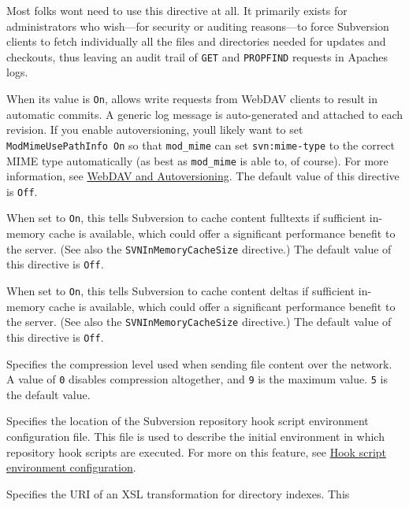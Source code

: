 \begin{description}
Most folks won\textquotesingle t need to use this directive at all. It
primarily exists for administrators who wish---for security or auditing
reasons---to force Subversion clients to fetch individually all the
files and directories needed for updates and checkouts, thus leaving an
audit trail of \texttt{GET} and \texttt{PROPFIND} requests in
Apache\textquotesingle s logs.
\item[\texttt{SVNAutoversioning\ On\textbar{}Off}]
When its value is \texttt{On}, allows write requests from WebDAV clients
to result in automatic commits. A generic log message is auto-generated
and attached to each revision. If you enable autoversioning,
you\textquotesingle ll likely want to set
\texttt{ModMimeUsePathInfo\ On} so that \texttt{mod\_mime} can set
\texttt{svn:mime-type} to the correct MIME type automatically (as best
as \texttt{mod\_mime} is able to, of course). For more information, see
\hyperref[svn.webdav]{WebDAV and Autoversioning}. The default value of
this directive is \texttt{Off}.
\item[\texttt{SVNCacheFullTexts\ On\textbar{}Off}]
When set to \texttt{On}, this tells Subversion to cache content
fulltexts if sufficient in-memory cache is available, which could offer
a significant performance benefit to the server. (See also the
\texttt{SVNInMemoryCacheSize} directive.) The default value of this
directive is \texttt{Off}.
\item[\texttt{SVNCacheTextDeltas\ On\textbar{}Off}]
When set to \texttt{On}, this tells Subversion to cache content deltas
if sufficient in-memory cache is available, which could offer a
significant performance benefit to the server. (See also the
\texttt{SVNInMemoryCacheSize} directive.) The default value of this
directive is \texttt{Off}.
\item[\texttt{SVNCompressionLevel\ level}]
Specifies the compression level used when sending file content over the
network. A value of \texttt{0} disables compression altogether, and
\texttt{9} is the maximum value. \texttt{5} is the default value.
\item[\texttt{SVNHooksEnv\ file-path}]
Specifies the location of the Subversion repository hook script
environment configuration file. This file is used to describe the
initial environment in which repository hook scripts are executed. For
more on this feature, see
\hyperref[svn.reposadmin.hooks.configuration]{Hook script environment
configuration}.
\item[\texttt{SVNIndexXSLT\ directory-path}]
Specifies the URI of an XSL transformation for directory indexes. This

\end{description}
